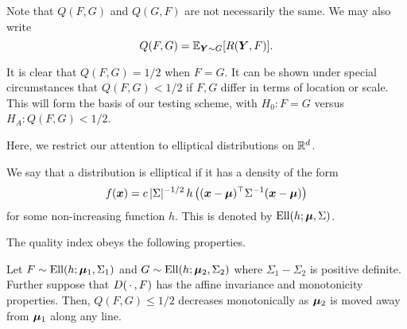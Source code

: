 Note that $Q(F, G)$ and $Q(G, F)$ are not necessarily the same.
We may also write
\begin{equation}
    Q(F, G) = \operatorname{\mathbb{E}}_{\bm{Y} \sim G}[R(\bm{Y}, F)].
\end{equation}


It is clear that $Q(F, G) = 1/2$ when $F = G$.
It can be shown under special circumstances that $Q(F, G) < 1/2$ if $F, G$
differ in terms of location or scale.
This will form the basis of our testing scheme, with $H_0: F = G$ versus $H_A:
Q(F, G) < 1/2$.

Here, we restrict our attention to elliptical distributions on $\mathbb{R}^d$.

\begin{definition}
    We say that a distribution is elliptical if it has a density of the form
    \begin{equation}
        f(\bm{x}) = c\, |\Sigma|^{-1/2}\, h\left((\bm{x} - \bm{\mu})^\top \Sigma^{-1} (\bm{x} - \bm{\mu})\right)
    \end{equation}
    for some non-increasing function $h$.
    This is denoted by $\operatorname{Ell}(h; \bm{\mu}, \Sigma)$.
\end{definition}



The quality index obeys the following properties.

\begin{proposition}
    Let $F \sim \operatorname{Ell}(h; \bm{\mu}_1, \Sigma_1)$ and $G \sim \operatorname{Ell}(h; \bm{\mu}_2,
    \Sigma_2)$ where $\Sigma_1 - \Sigma_2$ is positive definite.
    Further suppose that $D(\,\cdot\,, F)$ has the affine invariance and
    monotonicity properties.
    Then, $Q(F, G) \leq 1/2$ decreases monotonically as $\bm{\mu}_2$ is moved away
    from $\bm{\mu}_1$ along any line.
\end{proposition}

